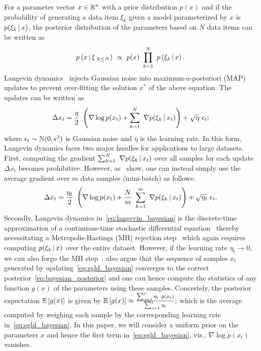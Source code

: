\documentclass[10pt]{article}
\begin{document}
\begin{appendices}
For a parameter vector $x \in \mathbb{R}^n$ with a prior distribution $p(x)$ and if the probability of generating a data item $\xi_k$ given a model parameterized by $x$ is $p(\xi_k \, \vert \, x)$, the posterior distribution of the parameters based on $N$ data items can be written as
\begin{equation}
    p\left(x \, \vert \, \xi_{\ k \leq N}\right)\ \propto\ p(x)\ \prod_{k=1}^N\ p\left(\xi_k \, \vert \, x\right).
    \label{eq:bayesian_posterior}
\end{equation}
Langevin dynamics~\citep{neal2011mcmc} injects Gaussian noise into maximum-a-posteriori (MAP) updates to prevent over-fitting the solution $x^*$ of the above equation. The updates can be written as
\begin{equation}
    \Delta x_t = \frac{\eta}{2}\ \left( \nabla \log p(x_t) + \sum_{k=1}^N\ \nabla p(\xi_k \, \vert \, x_t)\right) + \sqrt{\eta}\ \epsilon_t;
    \label{eq:langevin_bayesian}
\end{equation}
where $\epsilon_t \sim \mathrm{N}(0, \epsilon^2)$ is Gaussian noise and $\eta$ is the learning rate. In this form, Langevin dynamics faces two major hurdles for applications to large datasets. First, computing the gradient $\sum_{k=1}^N\ \nabla p(\xi_k \, \vert \, x_t)$ over all samples for each update $\Delta x_t$ becomes prohibitive. However, as~\citet{welling2011bayesian} show, one can instead simply use the average gradient over $m$ data samples (mini-batch) as follows:
\begin{equation}
    \Delta x_t = \frac{\eta_t}{2}\ \left( \nabla \log p(x_t) + \frac{N}{m}\ \sum_{k=1}^m\ \nabla p(\xi_k \, \vert \, x_t)\right) + \sqrt{\eta_t}\ \epsilon_t.
    \label{eq:sgld_bayesian}
\end{equation}
Secondly, Langevin dynamics in~\eqref{eq:langevin_bayesian} is the discrete-time approximation of a continuous-time stochastic differential equation~\citep{mandt2016variational} thereby necessitating a Metropolis-Hastings (MH) rejection step~\citep{roberts2002langevin} which again requires computing $p(\xi_k \, \vert \, x)$ over the entire dataset. However, if the learning rate $\eta_t \to 0$, we can also forgo the MH step~\citep{chen2014stochastic}. \citet{welling2011bayesian} also argue that the sequence of samples $x_t$ generated by updating~\eqref{eq:sgld_bayesian} converges to the correct posterior~\eqref{eq:bayesian_posterior} and one can hence compute the statistics of any function $g(x)$ of the parameters using these samples. Concretely, the posterior expectation $\mathbb{E}\left[g(x)\right]$ is given by
$
    \mathbb{E}\left[g(x)\right] \approx \frac{\sum_{s=1}^t \eta_t\ g(x_t)}{\sum_{s=1}^t \eta_t};
$
which is the average computed by weighing each sample by the corresponding learning rate in~\eqref{eq:sgld_bayesian}. In this paper, we will consider a uniform prior on the parameters $x$ and hence the first term in~\eqref{eq:sgld_bayesian}, viz., $\nabla \log p(x_t)$ vanishes.


\end{appendices}
\end{document}
